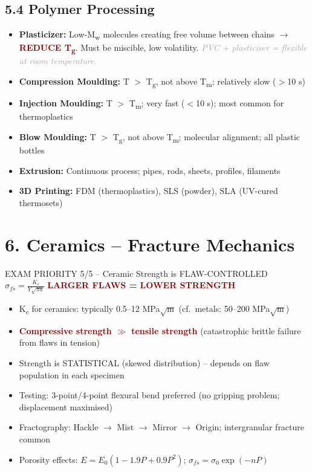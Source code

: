\documentclass[11pt,a4paper]{article}
\newcommand{\mysec}[1]{\section*{#1}}
\newcommand{\mysubsec}[1]{\subsection*{#1}}
\newcommand{\CRIT}[1]{\textcolor{DarkRed}{\textbf{#1}}}
\newcommand{\KEY}[1]{\textcolor{SecondaryDark}{\textbf{#1}}}
\newcommand{\EXA}[1]{\textcolor{DarkGray}{\textit{#1}}}
\begin{document}
\mysubsec{5.4 Polymer Processing}
\begin{itemize}[leftmargin=*,nosep]
    \item \KEY{Plasticizer:} Low-M\textsubscript{w} molecules creating free volume between chains $\to$ \CRIT{REDUCE T\textsubscript{g}}. Must be miscible, low volatility. \EXA{PVC + plasticiser = flexible at room temperature.}
    \item \textbf{Compression Moulding:} T $>$ T\textsubscript{g}, not above T\textsubscript{m}; relatively slow ($>$10 s)
    \item \textbf{Injection Moulding:} T $>$ T\textsubscript{m}; very fast ($<$10 s); most common for thermoplastics
    \item \textbf{Blow Moulding:} T $>$ T\textsubscript{g}, not above T\textsubscript{m}; molecular alignment; all plastic bottles
    \item \textbf{Extrusion:} Continuous process; pipes, rods, sheets, profiles, filaments
    \item \textbf{3D Printing:} FDM (thermoplastics), SLS (powder), SLA (UV-cured thermosets)
\end{itemize}

\newpage
\mysec{6. Ceramics -- Fracture Mechanics}

\begin{critbox}{EXAM PRIORITY 5/5 -- Ceramic Strength is FLAW-CONTROLLED}
\Large\centering
$\displaystyle \sigma_{fs} = \frac{K_c}{Y\sqrt{\pi a}}$ \hspace{1.5cm} \CRIT{LARGER FLAWS = LOWER STRENGTH}

\vspace{6pt}
\normalsize\raggedright
\begin{itemize}[leftmargin=*,nosep]
    \item K\textsubscript{c} for ceramics: typically 0.5--12 MPa$\sqrt{\text{m}}$ \hspace{0.5cm} (cf.\ metals: 50--200 MPa$\sqrt{\text{m}}$)
    \item \CRIT{Compressive strength $\gg$ tensile strength} (catastrophic brittle failure from flaws in tension)
    \item Strength is STATISTICAL (skewed distribution) -- depends on flaw population in each specimen
    \item Testing: 3-point/4-point flexural bend preferred (no gripping problem; displacement maximised)
    \item Fractography: Hackle $\to$ Mist $\to$ Mirror $\to$ Origin; intergranular fracture common
    \item Porosity effects: $E = E_0(1-1.9P+0.9P^2)$; $\sigma_{fs} = \sigma_0\exp(-nP)$
\end{itemize}
\end{critbox}
\end{document}
